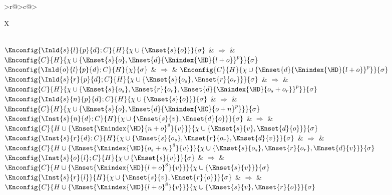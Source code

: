 \begin{xltabular}{\linewidth}{>{\scriptsize\raggedleft\arraybackslash}r@{\;}>{\scriptsize}c@{\;}>{\scriptsize\raggedright\arraybackslash}X}
	\midrule
	 \\

	${\Enconfig{\Inld{s}{l}{p}{d}; C}{H}{\chi\cup\{\Enset{s}{o}\}}{\sigma}}$ & $\Rightarrow$ & ${\Enconfig{C}{H}{\chi\cup\{\Enset{s}{o},\Enset{d}{\Enindex{\HD}{l+o}}^p\}}{\sigma}}$ \\
	${\Enconfig{\Inld{o}{l}{p}{d}; C}{H}{\chi}{\sigma}}$ & $\Rightarrow$ & ${\Enconfig{C}{H}{\chi\cup\{\Enset{d}{\Enindex{\HD}{l+o}}^p\}}{\sigma}}$ \\
	${\Enconfig{\Inld{s}{r}{p}{d}; C}{H}{\chi\cup\{\Enset{s}{o_s},\Enset{r}{o_r}\}}{\sigma}}$ & $\Rightarrow$ & ${\Enconfig{C}{H}{\chi\cup\{\Enset{s}{o_s},\Enset{r}{o_r},\Enset{d}{\Enindex{\HD}{o_s+o_r}}^p\}}{\sigma}}$ \\
	${\Enconfig{\Inld{s}{n}{p}{d}; C}{H}{\chi\cup\{\Enset{s}{o}\}}{\sigma}}$ & $\Rightarrow$ & ${\Enconfig{C}{H}{\chi\cup\{\Enset{s}{o},\Enset{d}{\Enindex{\HC}{o+n}^p}\}}{\sigma}}$ \\
	${\Enconfig{\Inst{s}{n}{d}; C}{H}{\chi\cup\{\Enset{s}{v},\Enset{d}{o}\}}{\sigma}}$ & $\Rightarrow$ & ${\Enconfig{C}{H\cup\{\Enset{\Enindex{\HD}{n+o}^8}{v}\}}{\chi\cup\{\Enset{s}{v},\Enset{d}{o}\}}{\sigma}}$ \\
	${\Enconfig{\Inst{s}{r}{d}; C}{H}{\chi\cup\{\Enset{s}{o_s},\Enset{r}{o_r},\Enset{d}{v}\}}{\sigma}}$ & $\Rightarrow$ & ${\Enconfig{C}{H\cup\{\Enset{\Enindex{\HD}{o_s+o_r}^8}{v}\}}{\chi\cup\{\Enset{s}{o_s},\Enset{r}{o_r},\Enset{d}{v}\}}{\sigma}}$ \\
	${\Enconfig{\Inst{s}{o}{l}; C}{H}{\chi\cup\{\Enset{s}{v}\}}{\sigma}}$ & $\Rightarrow$ & ${\Enconfig{C}{H\cup\{\Enset{\Enindex{\HD}{l+o}^8}{v}\}}{\chi\cup\{\Enset{s}{v}\}}{\sigma}}$ \\
	${\Enconfig{\Inst{s}{r}{l}}{H}{\chi\cup\{\Enset{s}{v},\Enset{r}{o}\}}{\sigma}}$ & $\Rightarrow$ & ${\Enconfig{C}{H\cup\{\Enset{\Enindex{\HD}{l+o}^8}{v}\}}{\chi\cup\{\Enset{s}{v},\Enset{r}{o}\}}{\sigma}}$ \\

	\midrule
	 \\


\end{xltabular}
